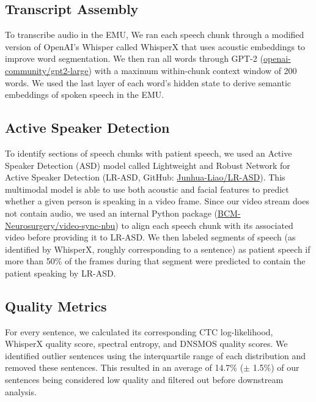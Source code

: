 \documentclass[pdflatex,sn-basic]{sn-jnl}%
\theoremstyle{thmstyleone}%
\theoremstyle{thmstyletwo}%
\theoremstyle{thmstylethree}%
\begin{document}
\subsection{Transcript Assembly}\label{subsec4}
To transcribe audio in the EMU, We ran each speech chunk through a modified version of OpenAI's Whisper called WhisperX \citep{bib39} that uses acoustic embeddings to improve word segmentation. We then ran all words through GPT-2 (\href{https://huggingface.co/openai-community/gpt2-large}{openai-community/gpt2-large}) with a maximum within-chunk context window of 200 words. We used the last layer of each word's hidden state to derive semantic embeddings of spoken speech in the EMU.

\subsection{Active Speaker Detection}\label{subsec5}
To identify sections of speech chunks with patient speech, we used an Active Speaker Detection (ASD) model called Lightweight and Robust Network for Active Speaker Detection (LR-ASD, GitHub: \href{https://github.com/Junhua-Liao/LR-ASD}{Junhua-Liao/LR-ASD}). This multimodal model is able to use both acoustic and facial features to predict whether a given person is speaking in a video frame. Since our video stream does not contain audio, we used an internal Python package (\href{https://github.com/BCM-Neurosurgery/video-sync-nbu}{BCM-Neurosurgery/video-sync-nbu}) to align each speech chunk with its associated video before providing it to LR-ASD. We then labeled segments of speech (as identified by WhisperX, roughly corresponding to a sentence) as patient speech if more than 50\% of the frames during that segment were predicted to contain the patient speaking by LR-ASD.

\subsection{Quality Metrics}\label{subsec6} 
For every sentence, we calculated its corresponding CTC log-likelihood, WhisperX quality score, spectral entropy, and DNSMOS quality scores. We identified outlier sentences using the interquartile range of each distribution and removed these sentences. This resulted in an average of 14.7\% ($\pm$ 1.5\%) of our sentences being considered low quality and filtered out before downstream analysis.
\end{document}
